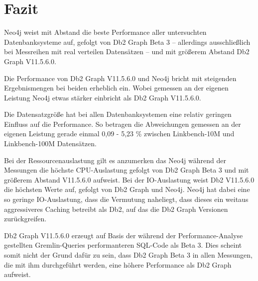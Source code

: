 \chapter{Fazit}

Neo4j weist mit Abstand die beste Performance aller untersuchten Datenbanksysteme auf, gefolgt von Db2 Graph Beta 3 -- allerdings ausschließlich bei Messreihen mit real verteilen Datensätzen -- und mit größerem Abstand Db2 Graph V11.5.6.0.

Die Performance von Db2 Graph V11.5.6.0 und Neo4j bricht mit steigenden Ergebnismengen bei beiden erheblich ein. Wobei gemessen an der eigenen Leistung Neo4j etwas stärker einbricht als Db2 Graph V11.5.6.0.

Die Datensatzgröße hat bei allen Datenbanksystemen eine relativ geringen Einfluss auf die Performance. So betragen die Abweichungen gemessen an der eigenen Leistung  gerade einmal 0,09 - 5,23 \% zwischen Linkbench-10M und Linkbench-100M Datensätzen.  

Bei der Ressourcenauslastung gilt es anzumerken das Neo4j während der Messungen die höchste CPU-Auslastung gefolgt von Db2 Graph Beta 3 und mit größerem Abstand V11.5.6.0 aufweist. Bei der IO-Auslastung weist Db2 V11.5.6.0 die höchsten Werte auf, gefolgt von Db2 Graph und Neo4j. Neo4j hat dabei eine so geringe IO-Auslastung, dass die Vermutung naheliegt, dass dieses ein weitaus aggressiveres Caching betreibt als Db2, auf das die Db2 Graph Versionen zurückgreifen. 

Db2 Graph V11.5.6.0 erzeugt auf Basis der während der Performance-Analyse gestellten Gremlin-Queries performanteren SQL-Code als Beta 3. Dies scheint somit nicht der Grund dafür zu sein, dass Db2 Graph Beta 3 in allen Messungen, die mit ihm durchgeführt werden, eine höhere Performance als Db2 Graph aufweist. 


\listoftodos